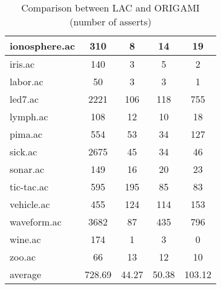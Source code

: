 \begin{table}[htbp]
\begin{tabular}{|l|c|c|c|c|}
		\hline
		ionosphere.ac   & 310           & 8                  & 14                       & 19                            \\
		\hline
		iris.ac         & 140           & 3                  & 5                        & 2                             \\
		\hline
		labor.ac        & 50            & 3                  & 3                        & 1                             \\
		\hline
		led7.ac         & 2221          & 106                & 118                      & 755                           \\
		\hline
		lymph.ac        & 108           & 12                 & 10                       & 18                            \\
		\hline
		pima.ac         & 554           & 53                 & 34                       & 127                           \\
		\hline
		sick.ac         & 2675          & 45                 & 34                       & 46                            \\
		\hline
		sonar.ac        & 149           & 16                 & 20                       & 23                            \\
		\hline
		tic-tac.ac      & 595           & 195                & 85                       & 83                            \\
		\hline
		vehicle.ac      & 455           & 124                & 114                      & 153                           \\
		\hline
		waveform.ac     & 3682          & 87                 & 435                      & 796                           \\
		\hline
		wine.ac         & 174           & 1                  & 3                        & 0                             \\
		\hline
		zoo.ac          & 66            & 13                 & 12                       & 10                            \\
		\hline
		average         & 728.69        & 44.27              & 50.38                    & 103.12                        \\
		\hline
		\end{tabular}
	\caption{Comparison between LAC and ORIGAMI (number of asserts)}
	\label{tab:comparison_lac_origami_uc}
\end{table}
